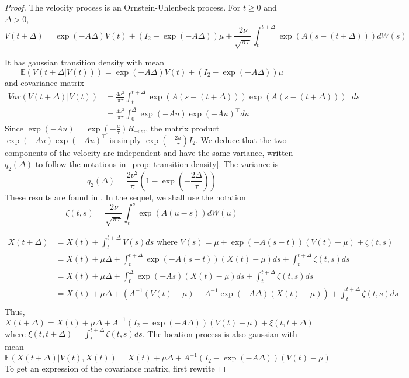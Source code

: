 \documentclass[11pt]{article}
\newcommand {\E}{\mathbb{E}}
\newcommand {\1}{\mathbb{1}}
\theoremstyle{definition}
\theoremstyle{remark}
\theoremstyle{remark}
\begin{document}
\begin{proof}
The velocity process is an Ornstein-Uhlenbeck process. For $t \geq 0$ and $\Delta >0$,
\begin{equation}
	V(t+\Delta)=\exp(-A\Delta) V(t)+ (I_2-\exp(-A\Delta))\mu +\frac{2\nu}{\sqrt{\pi \tau}}\int_{t}^{t+\Delta} \exp(A(s-(t+\Delta))) dW(s)
	\label{eq: RACVM solution}
\end{equation}

It has gaussian transition density with mean 
\begin{equation}
	\E(V(t+\Delta \vert V(t)))=\exp(-A\Delta) V(t)+ (I_2-\exp(-A\Delta))\mu 
\end{equation}
and covariance matrix 
\begin{align*}Var(V(t+\Delta) \vert V(t))&=\frac{4\nu^2}{\pi \tau} \int_{t}^{t+\Delta} \exp(A(s-(t+\Delta))) \exp(A(s-(t+\Delta)))^{\top} ds\\
	&=\frac{4\nu^2}{\pi \tau} \int_{0}^{\Delta} \exp(-Au) \exp(-Au)^{\top} du 
\end{align*}
Since $\exp(-Au)=\exp(-\frac{u}{\tau}) R_{-\omega u}$, the matrix product  $\exp(-Au) \exp(-Au)^{\top}$ is simply $\exp(-\frac{2u}{\tau}) I_2$. We deduce that the two components of the velocity are independent and have the same variance, written $q_2(\Delta)$ to follow the notations in~\ref{prop: transition density}. The variance is 
\begin{equation}
	q_2(\Delta)=\frac{2\nu^2}{\pi}\left(1-\exp\left(-\frac{2\Delta}{\tau}\right)\right)
\end{equation}
These results are found in \cite{gurarie_correlated_2017}.
In the sequel, we shall use the notation 
\[\zeta(t,s) =\frac{2\nu}{\sqrt{\pi \tau}}\int_{t}^{s} \exp(A(u-s)) dW(u)\] 


\begin{align*}
	X(t+\Delta)&=X(t)+\int_t^{t+\Delta} V(s) ds \mbox{ where } V(s)=\mu+\exp(-A(s-t))(V(t)-\mu)+\zeta(t,s) \\
	&= X(t)+\mu \Delta+\int_t^{t+\Delta} \exp(-A(s-t))(X(t)-\mu) ds +\int_t^{t+\Delta} \zeta(t,s) ds \\
	&= X(t)+\mu \Delta +\int_0^{\Delta} \exp(-As)(X(t)-\mu) ds +\int_t^{t+\Delta} \zeta(t,s) ds \\
	&=X(t)+\mu \Delta + (A^{-1}(V(t)-\mu)-A^{-1}\exp(-A\Delta)(X(t)-\mu))+\int_t^{t+\Delta} \zeta(t,s) ds \\
\end{align*}
Thus, 
\begin{equation}
	X(t+\Delta)=X(t)+\mu \Delta+A^{-1} \left( I_2-\exp(-A\Delta)\right)(V(t)-\mu) +\xi(t,t+\Delta) 
\end{equation}
where $ \xi(t,t+\Delta)=\int_t^{t+\Delta} \zeta(t,s)ds$.
The location process is also gaussian with mean 
\begin{equation}
	\E(X(t+\Delta) \vert V(t),X(t)) =X(t)+\mu \Delta+A^{-1} \left( I_2-\exp(-A\Delta)\right)(V(t)-\mu)
\end{equation}
To get an expression of the covariance matrix, first rewrite


\end{proof}
\end{document}
